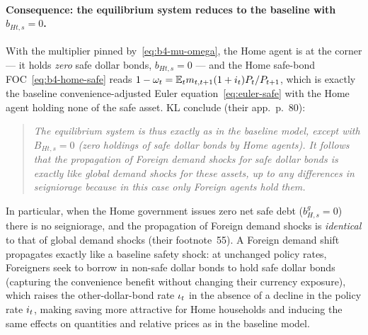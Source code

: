 \paragraph{Consequence: the equilibrium system reduces to the baseline with
$b_{Ht,s}=0$.} With the multiplier pinned by~\eqref{eq:b4-mu-omega}, the Home
agent is at the corner --- it holds \emph{zero} safe dollar bonds, $b_{Ht,s}=0$ ---
and the Home safe-bond FOC~\eqref{eq:b4-home-safe} reads
$1-\omega_t=\mathbb{E}_tm_{t,t+1}(1+i_t)P_t/P_{t+1}$, which is exactly the baseline
convenience-adjusted Euler equation~\eqref{eq:euler-safe} with the Home agent
holding none of the safe asset. KL conclude (their app.~p.~80):
\begin{quote}
\emph{The equilibrium system is thus exactly as in the baseline model, except with
$B_{Ht,s}=0$ (zero holdings of safe dollar bonds by Home agents). It follows that
the propagation of Foreign demand shocks for safe dollar bonds is exactly like
global demand shocks for these assets, up to any differences in seigniorage
because in this case only Foreign agents hold them.}
\end{quote}
In particular, when the Home government issues zero net safe debt ($b^g_{H,s}=0$)
there is no seigniorage, and the propagation of Foreign demand shocks is
\emph{identical} to that of global demand shocks (their footnote~55). A Foreign
demand shift propagates exactly like a baseline safety shock: at unchanged policy
rates, Foreigners seek to borrow in non-safe dollar bonds to hold safe dollar
bonds (capturing the convenience benefit without changing their currency
exposure), which raises the other-dollar-bond rate $\iota_t$ in the absence of a
decline in the policy rate $i_t$, making saving more attractive for Home
households and inducing the same effects on quantities and relative prices as in
the baseline model.

